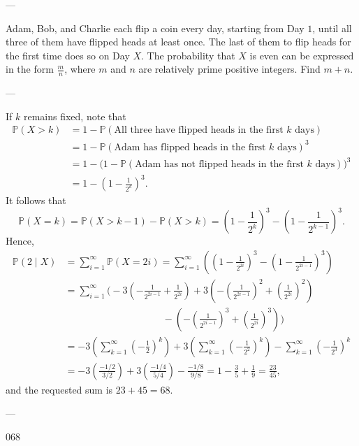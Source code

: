 
---

Adam, Bob, and Charlie each flip a coin every day, starting from Day $1$, until all three of them have flipped heads at least once. The last of them to flip heads for the first time does so on Day $X$. The probability that $X$ is even can be expressed in the form $\tfrac mn$, where $m$ and $n$ are relatively prime positive integers. Find $m+n$.

---

If $k$ remains fixed, note that
\begin{align*}
    \mathbb P(X>k)&=1-\mathbb P(\text{All three have flipped heads in the first }k\text{ days})\\
    &=1-\mathbb P(\text{Adam has flipped heads in the first }k\text{ days})^3\\
    &=1-\big(1-\mathbb P(\text{Adam has not flipped heads in the first }k\text{ days})\big)^3\\
    &=1-\left(1-\frac1{2^k}\right)^3.
\end{align*}
It follows that \[\mathbb P(X=k)=\mathbb P(X>k-1)-\mathbb P(X>k)=\left(1-\frac1{2^k}\right)^3-\left(1-\frac1{2^{k-1}}\right)^3.\]
Hence,
\begin{align*}
    \mathbb P(2\mid X)&=\sum_{i=1}^\infty\mathbb P(X=2i)=\sum_{i=1}^\infty\left(\left(1-\frac1{2^{2i}}\right)^3-\left(1-\frac1{2^{2i-1}}\right)^3\right)\\
    &=\sum_{i=1}^\infty\Bigg(-3\left(-\frac1{2^{2i-1}}+\frac1{2^{2i}}\right)+3\left(-\left(\frac1{2^{2i-1}}\right)^2+\left(\frac1{2^{2i}}\right)^2\right)\\
    &\qquad\qquad\qquad\qquad\qquad-\left(-\left(\frac1{2^{2i-1}}\right)^3+\left(\frac1{2^{2i}}\right)^3\right)\Bigg)\\
    &=-3\left(\sum_{k=1}^\infty\left(-\frac12\right)^k\right)+3\left(\sum_{k=1}^\infty\left(-\frac1{2^2}\right)^k\right)-\sum_{k=1}^\infty\left(-\frac1{2^3}\right)^k\\
    &=-3\left(\frac{-1/2}{3/2}\right)+3\left(\frac{-1/4}{5/4}\right)-\frac{-1/8}{9/8}=1-\frac35+\frac19=\frac{23}{45},
\end{align*}
and the requested sum is $23+45=68$.

---

068
